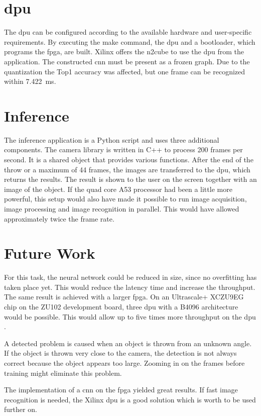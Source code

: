 \section{\Acrlong{dpu}}
\label{sec:conclusion:dpu}
The \acrshort{dpu} can be configured according to the available hardware and user-specific requirements.
By executing the make command, the \acrshort{dpu} and a bootloader, which programs the \acrshort{fpga}, are built.
Xilinx offers the \acrshort{n2cube}  to use the \acrshort{dpu} from the application.
The constructed \acrshort{cnn} must be present as a frozen graph.
Due to the quantization the Top1 accuracy was affected, but one frame can be recognized within \SI{7.422}{ms}.

\section{Inference}
\label{sec:conclusion:inference}
The inference application is a Python script and uses three additional components.
The camera library is written in C++ to process 200 frames per second.
It is a shared object that provides various functions.
After the end of the throw or a maximum of 44 frames, the images are transferred to the \acrshort{dpu}, which returns the results.
The result is shown to the user on the screen together with an image of the object.
If the quad core A53 processor had been a little more powerful, this setup would also have made it possible to run image acquisition, image processing and image recognition in parallel.
This would have allowed approximately twice the frame rate. 

\section{Future Work}
\label{sec:conclusion:future_work}
For this task, the neural network could be reduced in size, since no overfitting has taken place yet.
This would reduce the latency time and increase the throughput.
The same result is achieved with a larger \acrshort{fpga}.
On an Ultrascale+ XCZU9EG chip on the ZU102 development board, three \acrshort{dpu}  with a B4096 architecture would be possible.
This would allow up to five times more throughput on the \acrshort{dpu} \cite{dpu_product_guide}.

A detected problem is caused when an object is thrown from an unknown angle. 
If the object is thrown very close to the camera, the detection is not always correct because the object appears too large.
Zooming in on the frames before training might eliminate this problem.

The implementation of a \acrlong{cnn} on the \acrshort{fpga} yielded great results.
If fast image recognition is needed, the Xilinx \acrshort{dpu} is a good solution which is worth to be used further on.
